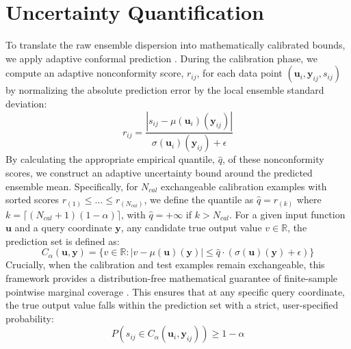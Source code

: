 \documentclass{iopjournal}
\begin{document}
\section{Uncertainty Quantification}
\label{sec:uq}

To translate the raw ensemble dispersion into mathematically calibrated bounds, we apply adaptive conformal prediction \cite{angelopoulous2023conformal, vovk1999conformal, vovk2022conformallearning, shafer2008conformaltutorial, papadopoulos2002conformalregression}. During the calibration phase, we compute an adaptive nonconformity score, $r_{ij}$, for each data point $(\mathbf{u}_i, \mathbf{y}_{ij}, s_{ij})$ by normalizing the absolute prediction error by the local ensemble standard deviation:
\[r_{ij} = \frac{|s_{ij} - \mu(\mathbf{u}_i)(\mathbf{y}_{ij})|}{\sigma(\mathbf{u}_i)(\mathbf{y}_{ij}) + \epsilon}\]
By calculating the appropriate empirical quantile, $\hat{q}$, of these nonconformity scores, we construct an adaptive uncertainty bound around the predicted ensemble mean. Specifically, for $N_{cal}$ exchangeable calibration examples with sorted scores $r_{(1)} \le \dots \le r_{(N_{cal})}$, we define the quantile as $\hat{q} = r_{(k)}$ where $k = \lceil(N_{cal}+1)(1-\alpha)\rceil$, with $\hat{q} = +\infty$ if $k > N_{cal}$. For a given input function $\mathbf{u}$ and a query coordinate $\mathbf{y}$, any candidate true output value $v \in \mathbb{R}$, the prediction set is defined as:
\[C_{\alpha}(\mathbf{u}, \mathbf{y}) = \{v \in \mathbb{R} : |v - \mu(\mathbf{u})(\mathbf{y})| \le \hat{q} \cdot (\sigma(\mathbf{u})(\mathbf{y}) + \epsilon)\}\]
Crucially, when the calibration and test examples remain exchangeable, this framework provides a distribution-free mathematical guarantee of finite-sample pointwise marginal coverage \cite{angelopoulous2023conformal, shafer2008conformaltutorial}. This ensures that at any specific query coordinate, the true output value falls within the prediction set with a strict, user-specified probability:
\[P(s_{ij} \in C_{\alpha}(\mathbf{u}_i, \mathbf{y}_{ij})) \ge 1 - \alpha\]
\end{document}
